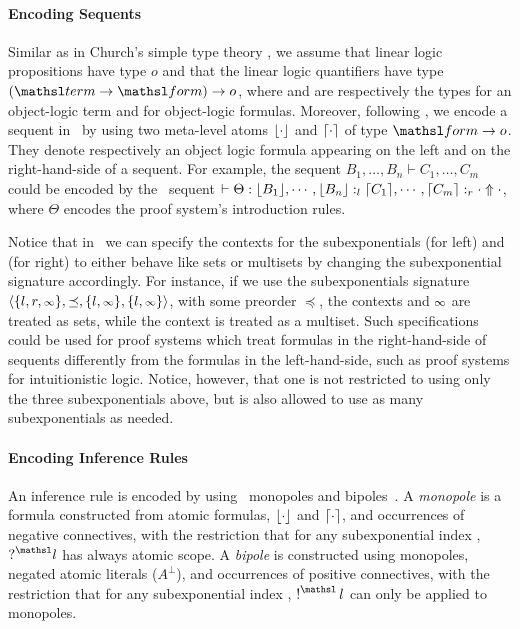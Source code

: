 \paragraph{Encoding Sequents}
Similar as in Church's simple type theory \cite{church40}, we assume that 
linear logic propositions
have type $o$ and  that the linear logic quantifiers
have type $(\tsl{term} \rightarrow \tsl{form}) \rightarrow o$, where 
 and  are respectively the types for an
object-logic term and for object-logic formulas. 
Moreover, following \cite{pimentel05lpar,pimentel01phd,nigam10jar}, 
we encode
a sequent in \sellf\ by using two meta-level atoms $\lfloor \cdot \rfloor$ and 
$\lceil \cdot \rceil$ of type $\tsl{form} \rightarrow o$. They denote 
respectively an object logic formula appearing on the left and on the 
right-hand-side of a sequent. For example, the sequent 
$B_1, \ldots, B_n \vdash C_1, \ldots, C_m$ could be encoded by 
the \sellf\ sequent $\vdash \Theta : 
\lfloor B_1 \rfloor, \cdots, \lfloor B_n \rfloor :_l \lceil C_1 \rceil, \cdots, \lceil C_m \rceil :_r \cdot
\Uparrow \cdot$, where $\Theta$ encodes the proof system's
introduction rules. 

Notice that in \sellf\ we can specify the contexts
for the
subexponentials  (for left) and  (for right) to either 
behave like sets or multisets by changing the subexponential signature 
accordingly. For instance, if we use the subexponentials signature 
$\langle\{l,r, {\scriptstyle\infty}\},\preceq,\{l, {\scriptstyle\infty}\}, \{l, {\scriptstyle\infty}\}\rangle$, with some
preorder $\preceq$, 
the contexts  and ${\scriptstyle\infty}$ are treated as sets, while
the context  is treated as a multiset.
Such specifications could be used for proof systems which treat formulas
in the right-hand-side of sequents differently from the formulas in the
left-hand-side, such as proof systems for intuitionistic logic. 
Notice, however,  that one is not restricted to using only the three
subexponentials above, but is also allowed to use as many
subexponentials as needed.


\paragraph{Encoding Inference Rules}
An inference rule is encoded by using \sellf\ monopoles and
bipoles~\cite{miller.ep}. A \emph{monopole} is a formula constructed from
atomic formulas, $\lfloor \cdot \rfloor$ and $\lceil \cdot \rceil$, and occurrences of
negative connectives, with the restriction that for any
subexponential index , $\nquest{l}$ has always atomic scope. A
\emph{bipole} is constructed using monopoles, negated atomic literals
($A^\bot$), and
occurrences of positive connectives, with the restriction that for any
subexponential index , $\nbang{l}$ can only be applied to monopoles.

